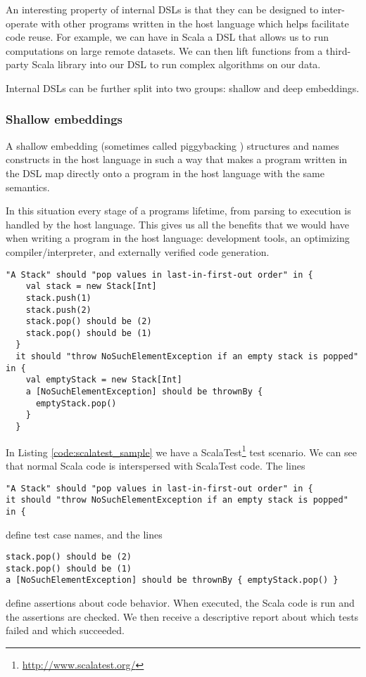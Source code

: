 An interesting property of internal DSLs is that they can be designed to inter-operate with other programs written in the host language which helps facilitate code reuse.
For example, we can have in Scala a DSL that allows us to run computations on large remote datasets.
We can then lift functions from a third-party Scala library into our DSL to run complex algorithms on our data.

Internal DSLs can be further split into two groups: shallow and deep embeddings.

\subsubsection{Shallow embeddings}

A shallow embedding (sometimes called piggybacking \autocite{Mernik:2005}) structures and names constructs in the host language in such a way that makes a program written in the DSL map directly onto a program in the host language with the same semantics.

In this situation every stage of a programs lifetime, from parsing to execution is handled by the host language.
This gives us all the benefits that we would have when writing a program in the host language: development tools, an optimizing compiler/interpreter, and externally verified code generation.

\begin{lstlisting}[caption=Example ScalaTest code, label=code:scalatest_sample]
  "A Stack" should "pop values in last-in-first-out order" in {
    val stack = new Stack[Int]
    stack.push(1)
    stack.push(2)
    stack.pop() should be (2)
    stack.pop() should be (1)
  }
  it should "throw NoSuchElementException if an empty stack is popped" in {
    val emptyStack = new Stack[Int]
    a [NoSuchElementException] should be thrownBy {
      emptyStack.pop()
    } 
  }
\end{lstlisting}

In Listing \ref{code:scalatest_sample} we have a ScalaTest\footnote{\url{http://www.scalatest.org/}} test scenario.
We can see that normal Scala code is interspersed with ScalaTest code.
The lines
\begin{verbatim}
"A Stack" should "pop values in last-in-first-out order" in {
it should "throw NoSuchElementException if an empty stack is popped" in {
\end{verbatim}
define test case names, and the lines
\begin{verbatim}
stack.pop() should be (2)
stack.pop() should be (1)
a [NoSuchElementException] should be thrownBy { emptyStack.pop() }
\end{verbatim}
define assertions about code behavior.
When executed, the Scala code is run and the assertions are checked.
We then receive a descriptive report about which tests failed and which succeeded.


